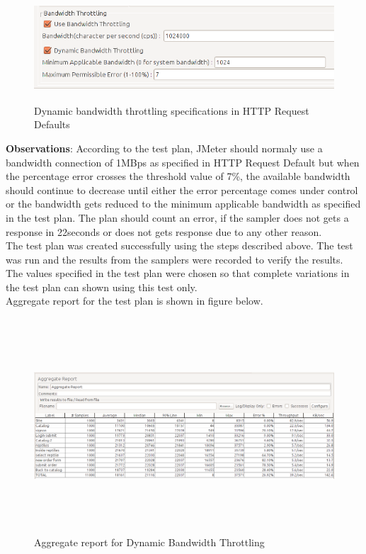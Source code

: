 \documentclass[12pt]{book}
\begin{document}
  \begin{figure}[H]
   \centering
   \includegraphics[width=15cm, height=4cm]{images/dbt_2}
   \caption{Dynamic bandwidth throttling specifications in HTTP Request Defaults \label{fig:fig59_JMeter}}
  \end{figure}
 
  \textbf{Observations}: According to the test plan, JMeter should normaly use a bandwidth connection of 1MBps as
  specified in HTTP Request Default but when the percentage error crosses the threshold value of
  7\%, the available bandwidth should continue to decrease until either the error percentage comes
  under control or the bandwidth gets reduced to the minimum applicable bandwidth as specified
  in the test plan. The plan should count an error, if the sampler does not gets a response in
  22seconds or does not gets response due to any other reason.\\
  The test plan was created successfully using the steps described above. The test was run and the
  results from the samplers were recorded to verify the results. The values specified in the test plan
  were chosen so that complete variations in the test plan can shown using this test only.\\
  Aggregate report for the test plan is shown in figure below.
  
  \begin{figure}[H]
   \centering
   \includegraphics[width=15cm, height=8cm]{images/dbt_3}
   \caption{Aggregate report for Dynamic Bandwidth Throttling \label{fig:fig60_JMeter}}
  \end{figure}
  
\end{document}

